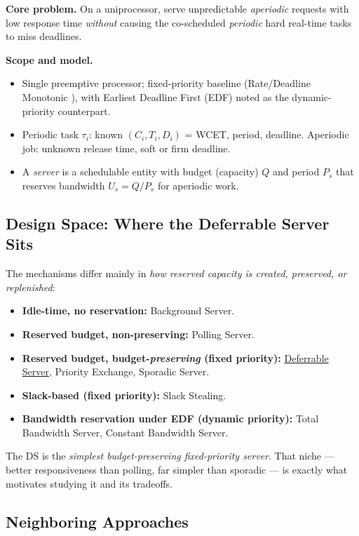 \documentclass[conference]{IEEEtran}
\begin{document}
\noindent\textbf{Core problem.} On a uniprocessor, serve unpredictable
\emph{aperiodic} requests with low response time \emph{without} causing the
co-scheduled \emph{periodic} hard real-time tasks to miss deadlines.

\noindent\textbf{Scope and model.}
\begin{itemize}
  \item Single preemptive processor; fixed-priority baseline (Rate/Deadline
        Monotonic \cite{liu1973scheduling}), with Earliest Deadline First (EDF)
        noted as the dynamic-priority counterpart.
  \item Periodic task $\tau_i$: known $(C_i, T_i, D_i)$ = WCET, period, deadline.
        Aperiodic job: unknown release time, soft or firm deadline.
  \item A \emph{server} is a schedulable entity with budget (capacity) $Q$ and
        period $P_s$ that reserves bandwidth $U_s = Q/P_s$ for aperiodic work.
\end{itemize}

\subsection{Design Space: Where the Deferrable Server Sits}

The mechanisms differ mainly in \emph{how reserved capacity is created,
preserved, or replenished}:
\begin{itemize}
  \item \textbf{Idle-time, no reservation:} Background Server.
  \item \textbf{Reserved budget, non-preserving:} Polling Server.
  \item \textbf{Reserved budget, budget-\emph{preserving} (fixed priority):}
        \underline{Deferrable Server}, Priority Exchange, Sporadic Server.
  \item \textbf{Slack-based (fixed priority):} Slack Stealing.
  \item \textbf{Bandwidth reservation under EDF (dynamic priority):}
        Total Bandwidth Server, Constant Bandwidth Server.
\end{itemize}
\noindent The DS is the \emph{simplest budget-preserving fixed-priority server}.
That niche --- better responsiveness than polling, far simpler than sporadic ---
is exactly what motivates studying it and its tradeoffs.

\subsection{Neighboring Approaches}
\end{document}
